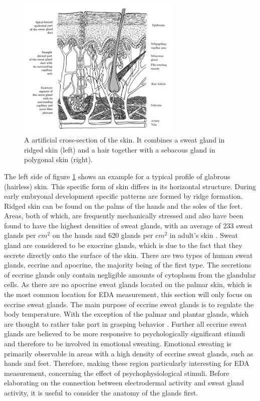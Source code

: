 \begin{figure}[ht]
\centering
\includegraphics[width=0.7\textwidth]{images/skinDermis.png}
\caption{A artificial cross-section of the skin. It combines a sweat gland in ridged skin (left) and a hair together with a sebacous gland in polygonal skin (right).\citep{boucsein2013electrodermal}}
\label{DermisImg}
\end{figure} 

The left side of figure \ref{DermisImg} shows an example for a typical profile of glabrous (hairless) skin. This specific form of skin differs in its horizontal structure. During early embryonal development specific patterns are formed by ridge formation. Ridged skin can be found on the palms of the hands and the soles of the feet. Areas, both of which, are frequently mechanically stressed and also have been found to have the highest densities of sweat glands, with an average of 233 sweat glands per $cm^{2}$ on the hands and 620 glands per $cm^{2}$ in adult's skin \citep{boucsein2013electrodermal}. Sweat gland are considered to be exocrine glands, which is due to the fact that they secrete directly onto the surface of the skin. There are two types of human sweat glands, eccrine and apocrine, the majority being of the first type. The secretions of eccrine glands only contain negligible amounts of cytoplasm from the glandular cells. As there are no apocrine sweat glands located on the palmar skin, which is the most common location for EDA measurement, this section will only focus on eccrine sweat glands. The main purpose of eccrine sweat glands is to regulate the body temperature. With the exception of the palmar and plantar glands, which are thought to rather take part in grasping behavior \cite{HANDBOOKPP}. Further all eccrine sweat glands are believed to be more responsive to psychologically significant stimuli and therefore to be involved in emotional sweating. Emotional sweating is primarily observable in areas with a high density of eccrine sweat glands, such as hands and feet. Therefore, making these region particularly interesting for EDA measurement, concerning the effect of psychophysiological stimuli. Before elaborating on the connection between electrodermal activity and sweat gland activity, it is useful to consider the anatomy of the glands first.

